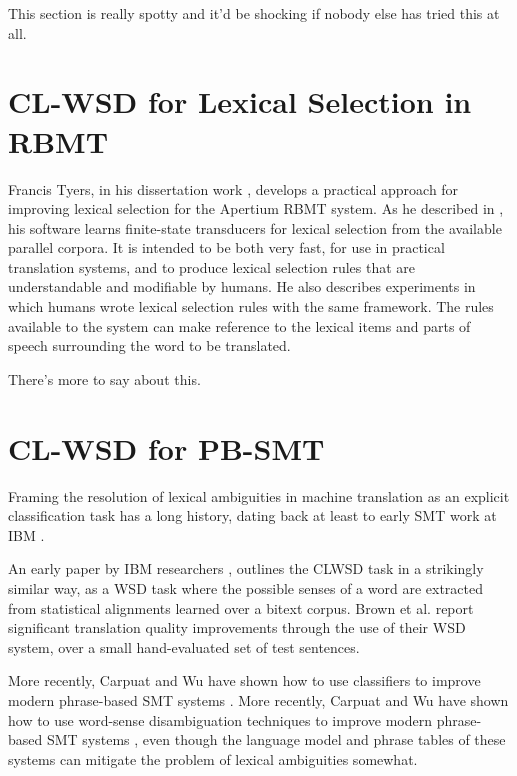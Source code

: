 This section is really spotty and it'd be shocking if nobody else has tried
this at all.

\section{CL-WSD for Lexical Selection in RBMT}
Francis Tyers, in his dissertation work \cite{tyers-dissertation}, develops a
practical approach for improving lexical selection for the Apertium RBMT
system. As he described in \cite{tyers-fst}, his software learns finite-state
transducers for lexical selection from the available parallel corpora.
It is intended to be both very fast, for use in practical translation systems,
and to produce lexical selection rules that are understandable and modifiable
by humans. He also describes experiments in which humans wrote lexical
selection rules with the same framework.
The rules available to the system can make reference to the lexical items and
parts of speech surrounding the word to be translated.

There's more to say about this.


\section{CL-WSD for PB-SMT}

Framing the resolution of lexical ambiguities in machine translation
as an explicit classification
task has a long history, dating back at least to early SMT work at IBM
\cite{Brown91word-sensedisambiguation}.

An early paper by IBM researchers \cite{Brown91word-sensedisambiguation},
outlines the CLWSD task in a strikingly similar way, as a WSD task where the
possible senses of a word are extracted from statistical alignments learned
over a bitext corpus.
Brown et al. report significant translation quality improvements
through the use of their WSD system, over a small hand-evaluated set of test
sentences.




More recently, Carpuat and Wu have
shown how to use classifiers to improve modern phrase-based SMT systems
\cite{carpuatpsd}.
More recently, Carpuat and Wu have
shown how to use word-sense disambiguation techniques to improve modern
phrase-based SMT systems \cite{carpuatpsd}, even though the language model and
phrase tables of these systems can mitigate the problem of lexical ambiguities
somewhat.


